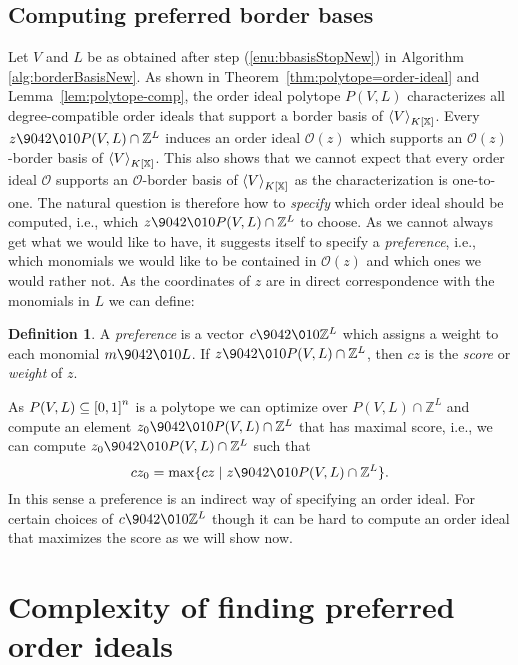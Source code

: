 \documentclass[11pt,oneside,english]{amsart}
\makeatletter
\numberwithin{equation}{section}
\numberwithin{figure}{section}
\theoremstyle{plain}
\theoremstyle{definition}
\newtheorem{defn}[thm]{Definition}
\theoremstyle{definition}
\theoremstyle{remark}
\theoremstyle{plain}
\theoremstyle{plain}
\theoremstyle{plain}
\theoremstyle{problem@}
\makeatother
\begin{document}
\subsection{\label{sub:preferredBasis}Computing preferred border bases}
Let $V$ and $L$ be as obtained after step (\ref{enu:bbasisStopNew}) in
Algorithm \ref{alg:borderBasisNew}.  As shown in
Theorem~\ref{thm:polytope=order-ideal} and
Lemma~\ref{lem:polytope-comp}, the order ideal polytope $P(V,L)$ characterizes
all degree-compatible order ideals that support a border basis of
${{\left\langle {V}\right\rangle}\sb{K[\mathbb{X}]}}$. Every $z {\9042\010} P(V,L) \cap {\mathbb{Z}}^L$ induces an order ideal ${\mathcal{O}}(z)$
which supports an ${\mathcal{O}}(z)$-border basis of ${{\left\langle {V}\right\rangle}\sb{K[\mathbb{X}]}}$. This
also shows that we cannot expect that every order ideal ${\mathcal{O}}$ supports an
${\mathcal{O}}$-border basis of ${{\left\langle {V}\right\rangle}\sb{K[\mathbb{X}]}}$ as the characterization is one-to-one. 
The natural question is therefore how to
\emph{specify} which order ideal should be computed, i.e., which $z {\9042\010} P(V,L)
\cap {\mathbb{Z}}^L$ to choose. As we cannot always get what we would like to have, it
suggests itself to specify a \emph{preference}, i.e., which monomials we would like
to be contained in ${\mathcal{O}}(z)$ and which ones we would rather not.
As the coordinates
of $z$ are in direct correspondence with the monomials in $L$ we can define:

\begin{defn}
  A \emph{preference} is a vector $c {\9042\010} {\mathbb{Z}}^L$ which assigns a weight to each
  monomial $m {\9042\010} L$. If $z{\9042\010} P(V,L) \cap {\mathbb{Z}}^L$, then $cz$ is the
  \emph{score} or \emph{weight} of $z$.
\end{defn}

As $P(V,L) \subseteq {{[0,1]}\sp{{n}}}$ is a polytope we can optimize over $P(V,L) \cap
{\mathbb{Z}}^L$ and compute an element $z_0 {\9042\010} P(V,L) \cap {\mathbb{Z}}^L$ that has maximal
score, i.e., we can compute $z_0 {\9042\010} P(V,L) \cap {\mathbb{Z}}^L$ such that
\[cz_0 = \max\{ cz \mid z {\9042\010} P(V,L) \cap {\mathbb{Z}}^L \}.\] In this sense a
preference is an indirect way of specifying an order ideal. For
certain choices of $c {\9042\010} {\mathbb{Z}}^L$ though it can be hard to compute an
order ideal that maximizes the score as we will show now.

\section{Complexity of finding preferred order ideals}
\label{sec:complexity-finding-ord-ideal}
\end{document}
